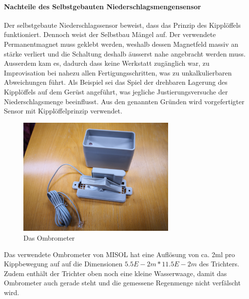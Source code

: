 \paragraph{\textbf{Nachteile des Selbstgebauten Niederschlagsmengensensor}}
Der selbstgebaute Niederschlagssensor beweist, dass das Prinzip des Kipplöffels funktioniert. Dennoch weist der Selbstbau Mängel auf. Der verwendete Permanentmagnet muss geklebt werden, weshalb dessen Magnetfeld massiv an stärke verliert und die Schaltung deshalb äusserst nahe angebracht werden muss. Ausserdem kam es, dadurch dass keine Werkstatt zugänglich war, zu Improvisation bei nahezu allen Fertigungsschritten, was zu unkalkulierbaren Abweichungen führt. Als Beispiel sei das Spiel der drehbaren Lagerung des Kipplöffels auf dem Gerüst angeführt, was jegliche Justierungsversuche der Niederschlagsmenge beeinflusst. Aus den genannten Gründen wird vorgefertigter Sensor mit Kipplöffelprinzip verwendet.

\begin{figure}[hbtp]
\centering
\includegraphics[width=0.7\textwidth]{graphics/ombrometer/IMG_20190118_110027.jpg}
\caption{Das Ombrometer}
\label{fig:verwendetes_ombrometer}
\end{figure}

Das verwendete Ombrometer von MISOL hat eine Auflösung von ca. 2ml pro Kippbewegung auf auf die Dimensionen $5.5E-2m*11.5E-2m$ des Trichters. Zudem enthält der Trichter oben noch eine kleine Wasserwaage, damit das Ombrometer auch gerade steht und die gemessene Regenmenge nicht verfälscht wird.

